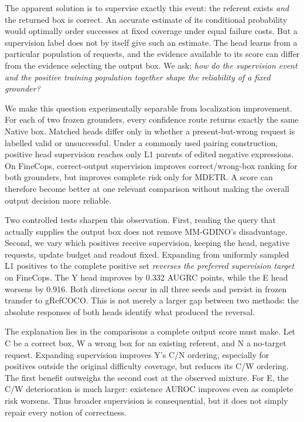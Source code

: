 \documentclass[10pt,twocolumn,letterpaper]{article}
\begin{document}
The apparent solution is to supervise exactly this event: the referent
exists \emph{and} the returned box is correct. An accurate estimate of its
conditional probability would optimally order successes at fixed coverage
under equal failure costs. But a supervision label does not by itself give
such an estimate. The head learns from a particular population of requests,
and the evidence available to its score can differ from the evidence selecting
the output box. We ask: \emph{how do the supervision event and the positive
training population together shape the reliability of a fixed grounder?}

We make this question experimentally separable from localization improvement.
For each of two frozen grounders, every confidence route returns exactly the
same Native box. Matched heads differ only in whether a present-but-wrong
request is labelled valid or unsuccessful. Under a commonly used pairing
construction, positive head supervision reaches only L1 parents of edited
negative expressions. On FineCops, correct-output supervision improves
correct/wrong-box ranking for both grounders, but improves complete risk
only for MDETR. A score can therefore become better at one relevant
comparison without making the overall output decision more reliable.

Two controlled tests sharpen this observation. First, reading the query
that actually supplies the output box does not remove MM-GDINO's disadvantage.
Second, we vary which positives receive supervision, keeping the head,
negative requests, update budget and readout fixed. Expanding from uniformly
sampled L1 positives to the complete positive set \emph{reverses the
preferred supervision target} on FineCops. The Y head improves by 0.332
AUGRC points, while the E head worsens by 0.916. Both directions occur in
all three seeds and persist in frozen transfer to gRefCOCO. This is not
merely a larger gap between two methods: the absolute responses of both
heads identify what produced the reversal.

The explanation lies in the comparisons a complete output score must make.
Let C be a correct box, W a wrong box for an existing referent, and N a
no-target request. Expanding supervision improves Y's C/N ordering, especially
for positives outside the original difficulty coverage, but reduces its C/W
ordering. The first benefit outweighs the second cost at the observed mixture.
For E, the C/W deterioration is much larger: existence AUROC improves even
as complete risk worsens. Thus broader supervision is consequential, but it
does not simply repair every notion of correctness.
\end{document}

